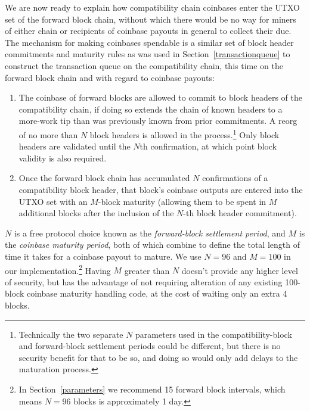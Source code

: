 We are now ready to explain how compatibility chain coinbases enter
the UTXO set of the forward block chain, without which there would be
no way for miners of either chain or recipients of coinbase payouts in
general to collect their due.  The mechanism for making coinbases
spendable is a similar set of block header commitments and maturity
rules as was used in Section~\ref{transactionqueue} to construct the
transaction queue on the compatibility chain, this time on the forward
block chain and with regard to coinbase payouts:

\begin{enumerate}

  \item

    The coinbase of forward blocks are allowed to commit to block
    headers of the compatibility chain, if doing so extends the chain
    of known headers to a more-work tip than was previously known from
    prior commitments.  A reorg of no more than $N$ block headers is
    allowed in the process.\footnote{Technically the two separate $N$
    parameters used in the compatibility-block and forward-block
    settlement periods could be different, but there is no security
    benefit for that to be so, and doing so would only add delays to
    the maturation process.}  Only block headers are validated until
    the $N$th confirmation, at which point block validity is also
    required.

  \item

    Once the forward block chain has accumulated $N$ confirmations of
    a compatibility block header, that block's coinbase outputs are
    entered into the UTXO set with an $M$-block maturity (allowing
    them to be spent in $M$ additional blocks after the inclusion of
    the $N$-th block header commitment).

\end{enumerate}

$N$ is a free protocol choice known as the \emph{forward-block
  settlement period}, and $M$ is the \emph{coinbase maturity period},
  both of which combine to define the total length of time it takes
  for a coinbase payout to mature.  We use $N = 96$ and $M = 100$ in
  our implementation.\footnote{In Section~\ref{parameters} we
  recommend \SI{15}{\min} forward block intervals, which means $N =
  96$ blocks is approximately \num{1} day.}  Having $M$ greater than
  $N$ doesn't provide any higher level of security, but has the
  advantage of not requiring alteration of any
  existing \num{100}-block coinbase maturity handling code, at the
  cost of waiting only an extra \num{4} blocks.

